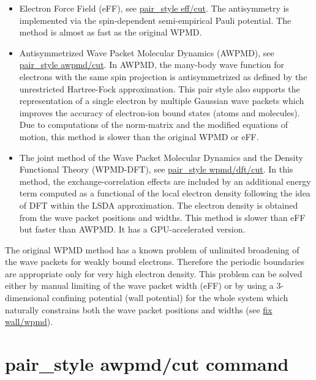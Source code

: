 \documentclass[a4paper,12pt]{article}
\begin{document}
\begin{itemize}
  
  \item Electron Force Field (eFF), see \href{pair_eff.html}{pair\_style eff/cut}. The antisymmetry is implemented via the spin-dependent semi-empirical Pauli potential. The method is almost as fast as the original WPMD.
  
  \item Antisymmetrized Wave Packet Molecular Dynamics (AWPMD), see \href{pair_awpmd.html}{pair\_style awpmd/cut}. In AWPMD, the many-body wave function for electrons with the same spin projection is antisymmetrized as defined by the unrestricted Hartree-Fock approximation. This pair style also supports the representation of a single electron by multiple Gaussian wave packets which improves the accuracy of electron-ion bound states (atoms and molecules). Due to computations of the norm-matrix and the modified equations of motion, this method is slower than the original WPMD or eFF.
  
  \item The joint method of the Wave Packet Molecular Dynamics and the Density Functional Theory (WPMD-DFT), see \href{pair_wpmd.html}{pair\_style wpmd/dft/cut}. In this method, the exchange-correlation effects are included by an additional energy term computed as a functional of the local electron density following the idea of DFT within the LSDA approximation. The electron density is obtained from the wave packet positions and widths. This method is slower than eFF but faster than AWPMD. It has a GPU-accelerated version.
  
\end{itemize}

The original WPMD method has a known problem of unlimited broadening of the wave packets for weakly bound electrons. Therefore the periodic boundaries are appropriate only for very high electron density. This problem can be solved either by manual limiting of the wave packet width (eFF) or by using a 3-dimensional confining potential (wall potential) for the whole system which naturally constrains both the wave packet positions and widths (see \href{fix_wall_wpmd.html}{fix wall/wpmd}).


\section*{pair\_style awpmd/cut command}
\end{document}
